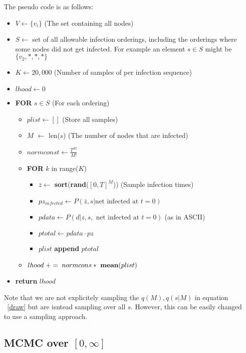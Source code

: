 \documentclass{article}
\begin{document}
The pseudo code is as follows:

\begin{itemize}
\item $V \leftarrow \{v_i\}$    (The set containing all nodes)
\item  $ S\leftarrow$ set of all allowable infection orderings, including the orderings where some nodes did not get infected.  For example an element $s \in S$ might be $\{v_2, *, *,*\}$
\item $K \leftarrow 20,000$  (Number of samples of per infection sequence)
\item $lhood \leftarrow 0$
\item \textbf{FOR} $s \in S$           (For each ordering)
\begin{itemize}
\item $plist \leftarrow []$ (Store all samples)
\item $M$ $\leftarrow$ len($s$)  (The number of nodes that are infected)
\item $normconst \leftarrow \frac{T^M}{M!}$
\item \textbf{FOR} $k$ in range($K$)
\begin{itemize}
\item $\bar{z} \leftarrow$ \textbf{sort}(\textbf{rand}($[0,T]^M$))  (Sample infection times)
\item $pz_{infected} \leftarrow P(\bar{z}, s | \text{net infected at } t=0)$ 
\item $pdata \leftarrow P(d | z,s, \text{ net infected at } t=0)$ (as in ASCII)
\item $ptotal \leftarrow  pdata \cdot pz$
\item $plist$ \textbf{append}  $ptotal$
\end{itemize}
\item $ lhood \; += \; normcons * \text{ \textbf{mean}}(plist)$
\end{itemize}
\item \textbf{return} $lhood$
\end{itemize}

Note that we are not explicitely sampling the $q(M), q(s |M)$ in equation ~\ref{draw} but are isntead sampling over all $s$. 
However, this can be easily changed to use a  sampling approach.

\pagebreak

\subsection{MCMC over $[0, \infty]$}
\end{document}
